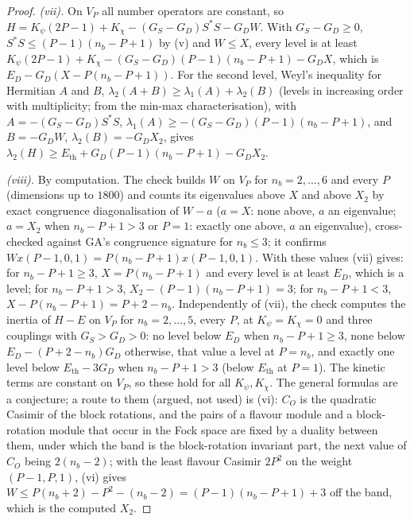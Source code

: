 \begin{proof}
\emph{(vii).} On $V_{P}$ all number operators are constant, so $H = K_{\psi}(2P - 1) + K_{\chi} - (G_{S} - G_{D})S^{*}S - G_{D}W$. With $G_{S} - G_{D} \ge 0$, $S^{*}S \le (P - 1)(n_{b} - P + 1)$ by (v) and $W \le X$, every level is at least $K_{\psi}(2P - 1) + K_{\chi} - (G_{S} - G_{D})(P - 1)(n_{b} - P + 1) - G_{D}X$, which is $E_{D} - G_{D}(X - P(n_{b} - P + 1))$. For the second level, Weyl's inequality for Hermitian $A$ and $B$, $\lambda_{2}(A + B) \ge \lambda_{1}(A) + \lambda_{2}(B)$ (levels in increasing order with multiplicity; from the min-max characterisation), with $A = -(G_{S} - G_{D})S^{*}S$, $\lambda_{1}(A) \ge -(G_{S} - G_{D})(P - 1)(n_{b} - P + 1)$, and $B = -G_{D}W$, $\lambda_{2}(B) = -G_{D}X_{2}$, gives $\lambda_{2}(H) \ge E_{\mathrm{th}} + G_{D}(P - 1)(n_{b} - P + 1) - G_{D}X_{2}$.

\emph{(viii).} By computation. The check builds $W$ on $V_{P}$ for $n_{b} = 2, \ldots, 6$ and every $P$ (dimensions up to $1800$) and counts its eigenvalues above $X$ and above $X_{2}$ by exact congruence diagonalisation of $W - a$ ($a = X$: none above, $a$ an eigenvalue; $a = X_{2}$ when $n_{b} - P + 1 > 3$ or $P = 1$: exactly one above, $a$ an eigenvalue), cross-checked against GA's congruence signature for $n_{b} \le 3$; it confirms $Wx(P - 1, 0, 1) = P(n_{b} - P + 1)x(P - 1, 0, 1)$. With these values (vii) gives: for $n_{b} - P + 1 \ge 3$, $X = P(n_{b} - P + 1)$ and every level is at least $E_{D}$, which is a level; for $n_{b} - P + 1 > 3$, $X_{2} - (P - 1)(n_{b} - P + 1) = 3$; for $n_{b} - P + 1 < 3$, $X - P(n_{b} - P + 1) = P + 2 - n_{b}$. Independently of (vii), the check computes the inertia of $H - E$ on $V_{P}$ for $n_{b} = 2, \ldots, 5$, every $P$, at $K_{\psi} = K_{\chi} = 0$ and three couplings with $G_{S} > G_{D} > 0$: no level below $E_{D}$ when $n_{b} - P + 1 \ge 3$, none below $E_{D} - (P + 2 - n_{b})G_{D}$ otherwise, that value a level at $P = n_{b}$, and exactly one level below $E_{\mathrm{th}} - 3G_{D}$ when $n_{b} - P + 1 > 3$ (below $E_{\mathrm{th}}$ at $P = 1$). The kinetic terms are constant on $V_{P}$, so these hold for all $K_{\psi}, K_{\chi}$. The general formulas are a conjecture; a route to them (argued, not used) is (vi): $C_{O}$ is the quadratic Casimir of the block rotations, and the pairs of a flavour module and a block-rotation module that occur in the Fock space are fixed by a duality between them, under which the band is the block-rotation invariant part, the next value of $C_{O}$ being $2(n_{b} - 2)$; with the least flavour Casimir $2P^{2}$ on the weight $(P - 1, P, 1)$, (vi) gives $W \le P(n_{b} + 2) - P^{2} - (n_{b} - 2) = (P - 1)(n_{b} - P + 1) + 3$ off the band, which is the computed $X_{2}$.


\end{proof}
